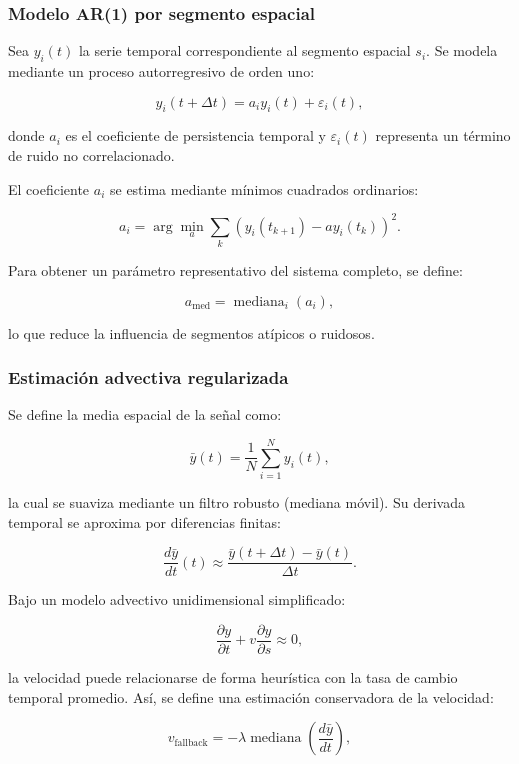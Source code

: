 \documentclass[
  spanish,
  us-letterpaper,
]{scrreprt}
\numberwithin{equation}{section}
\begin{document}
\subsubsection{Modelo AR(1) por segmento
espacial}\label{modelo-ar1-por-segmento-espacial}

Sea \(y_i(t)\) la serie temporal correspondiente al segmento espacial
\(s_i\). Se modela mediante un proceso autorregresivo de orden uno:

\[
y_i(t+\Delta t) = a_i y_i(t) + \varepsilon_i(t),
\]

donde \(a_i\) es el coeficiente de persistencia temporal y
\(\varepsilon_i(t)\) representa un término de ruido no correlacionado.

El coeficiente \(a_i\) se estima mediante mínimos cuadrados ordinarios:

\[
a_i = \arg\min_a \sum_{k} \left(y_i(t_{k+1}) - a y_i(t_k)\right)^2.
\]

Para obtener un parámetro representativo del sistema completo, se
define:

\[
a_{\text{med}} = \operatorname{mediana}_i \left( a_i \right),
\]

lo que reduce la influencia de segmentos atípicos o ruidosos.

\subsubsection{Estimación advectiva
regularizada}\label{estimaciuxf3n-advectiva-regularizada}

Se define la media espacial de la señal como:

\[
\bar{y}(t) = \frac{1}{N} \sum_{i=1}^{N} y_i(t),
\]

la cual se suaviza mediante un filtro robusto (mediana móvil). Su
derivada temporal se aproxima por diferencias finitas:

\[
\frac{d\bar{y}}{dt}(t) \approx \frac{\bar{y}(t+\Delta t)-\bar{y}(t)}{\Delta t}.
\]

Bajo un modelo advectivo unidimensional simplificado:

\[
\frac{\partial y}{\partial t} + v \frac{\partial y}{\partial s} \approx 0,
\]

la velocidad puede relacionarse de forma heurística con la tasa de
cambio temporal promedio. Así, se define una estimación conservadora de
la velocidad:

\[
v_{\text{fallback}} = -\lambda \operatorname{mediana}\left( \frac{d\bar{y}}{dt} \right),
\]
\end{document}
